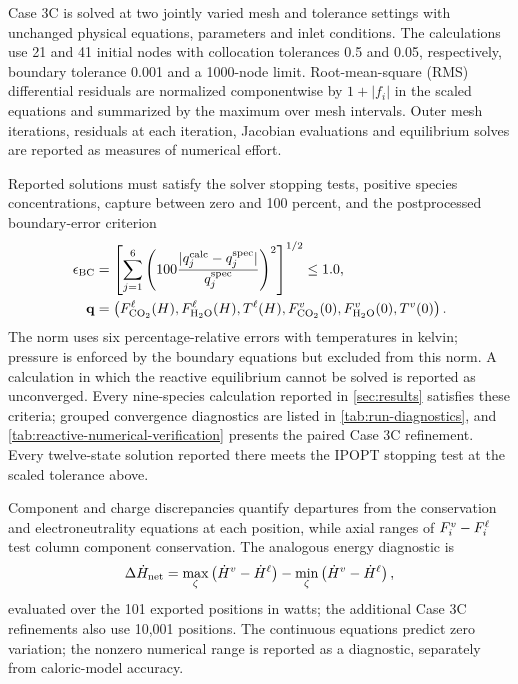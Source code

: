 Case 3C is solved at two jointly varied mesh and tolerance settings with unchanged physical equations, parameters and inlet conditions.
The calculations use 21 and 41 initial nodes with collocation tolerances 0.5 and 0.05, respectively, boundary tolerance 0.001 and a 1000-node limit.
Root-mean-square (RMS) differential residuals are normalized componentwise by $1+|f_i|$ in the scaled equations and summarized by the maximum over mesh intervals.
Outer mesh iterations, residuals at each iteration, Jacobian evaluations and equilibrium solves are reported as measures of numerical effort.

Reported solutions must satisfy the solver stopping tests, positive species concentrations, capture between zero and 100 percent, and the postprocessed boundary-error criterion
\begin{align}
 \epsilon_{\mathrm{BC}}&=\left[\sum_{j=1}^{6}
 \left(100\frac{|q_j^{\mathrm{calc}}-q_j^{\mathrm{spec}}|}{q_j^{\mathrm{spec}}}\right)^2\right]^{1/2}\leq1.0,\label{eq:postprocessed-bc}\\
 \mathbf q&=\left(F_{\COtwo}^{\liq}(H),F_{\HtwoO}^{\liq}(H),T^{\liq}(H),
 F_{\COtwo}^{\vap}(0),F_{\HtwoO}^{\vap}(0),T^{\vap}(0)\right).
\end{align}
The norm uses six percentage-relative errors with temperatures in kelvin; pressure is enforced by the boundary equations but excluded from this norm.
A calculation in which the reactive equilibrium cannot be solved is reported as unconverged.
Every nine-species calculation reported in \cref{sec:results} satisfies these criteria; grouped convergence diagnostics are listed in \cref{tab:run-diagnostics}, and \cref{tab:reactive-numerical-verification} presents the paired Case 3C refinement.
Every twelve-state solution reported there meets the IPOPT stopping test at the scaled tolerance above.

Component and charge discrepancies quantify departures from the conservation and electroneutrality equations at each position, while axial ranges of $F_i^v-F_i^\ell$ test column component conservation.
The analogous energy diagnostic is
\begin{equation}
 \Delta\dot H_{\mathrm{net}}=
 \max_{\zeta}\left(\dot H^v-\dot H^\ell\right)
 -\min_{\zeta}\left(\dot H^v-\dot H^\ell\right),\label{eq:energy-range}
\end{equation}
evaluated over the 101 exported positions in watts; the additional Case 3C refinements also use 10,001 positions.
The continuous equations predict zero variation; the nonzero numerical range is reported as a diagnostic, separately from caloric-model accuracy.

